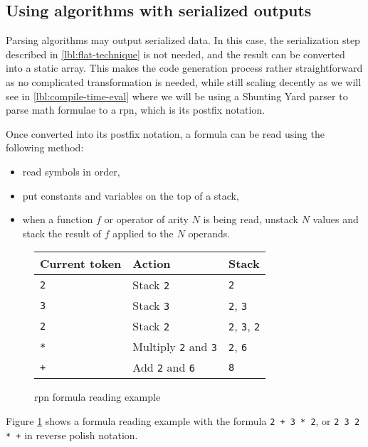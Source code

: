 \documentclass[../main]{subfiles}
\begin{document}
\subsection{
  Using algorithms with serialized outputs
}
\label{lbl:codegen-from-rpn}

Parsing algorithms may output serialized data. In this case, the serialization
step described in \ref{lbl:flat-technique} is not needed, and the result
can be converted into a static array.
This makes the code generation process rather straightforward as no complicated
transformation is needed, while still scaling decently as we will see in
\ref{lbl:compile-time-eval} where we will be using a
Shunting Yard parser \cite{shunting-yard} to parse math formulae to a
\gls{rpn}, which is its postfix notation.

Once converted into its postfix notation,
a formula can be read using the following method:

\begin{itemize}
\item read symbols in order,
\item put constants and variables on the top of a stack,
\item when a function $f$ or operator of arity $N$ is being read,
      unstack $N$ values and stack the result of $f$ applied
      to the $N$ operands.
\end{itemize}

\begin{figure}
\begin{tabular}{|l|l|l|}
\hline
Current token & Action & Stack \\
\hline
\lstinline|2| & Stack \lstinline|2| & \lstinline|2| \\
\lstinline|3| & Stack \lstinline|3| & \lstinline|2|, \lstinline|3| \\
\lstinline|2| & Stack \lstinline|2| & \lstinline|2|, \lstinline|3|, \lstinline|2| \\
\lstinline|*| & Multiply \lstinline|2| and \lstinline|3| & \lstinline|2|, \lstinline|6| \\
\lstinline|+| & Add \lstinline|2| and \lstinline|6| & \lstinline|8| \\
\hline
\end{tabular}
\caption{\gls{rpn} formula reading example}
\label{fig:rpn-reading-example}
\end{figure}

Figure \ref{fig:rpn-reading-example} shows a formula reading example with
the formula \lstinline{2 + 3 * 2}, or \lstinline{2 3 2 * +} in
reverse polish notation.
\end{document}

